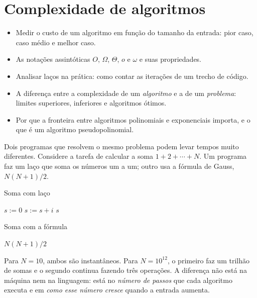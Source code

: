 \chapter{Complexidade de algoritmos}\label{cap:complex}\label{sec:complex}
\begin{objetivos}
\begin{itemize}
  \item Medir o custo de um algoritmo em função do tamanho da entrada: pior caso, caso médio e melhor caso.
  \item As notações assintóticas $O$, $\Omega$, $\Theta$, $o$ e $\omega$ e suas propriedades.
  \item Analisar laços na prática: como contar as iterações de um trecho de código.
  \item A diferença entre a complexidade de um \emph{algoritmo} e a de um \emph{problema}: limites superiores, inferiores e algoritmos ótimos.
  \item Por que a fronteira entre algoritmos polinomiais e exponenciais importa, e o que é um algoritmo pseudopolinomial.
\end{itemize}
\end{objetivos}

Dois programas que resolvem o mesmo problema podem levar tempos muito diferentes. Considere a tarefa de calcular a soma $1+2+\cdots+N$. Um programa faz um laço que soma os números um a um; outro usa a fórmula de Gauss, $N(N+1)/2$.
\begin{figura}
\begin{minipage}[t]{0.42\linewidth}
\begin{pseudo}{Soma com laço}
\begin{algorithmic}
\State $s:=0$
 \State $s:=s+i$ \EndFor
\State \Return $s$
\end{algorithmic}
\end{pseudo}
\end{minipage}\hspace{0.06\linewidth}%
\begin{minipage}[t]{0.42\linewidth}
\begin{pseudo}{Soma com a fórmula}
\begin{algorithmic}
\State \Return $N(N+1)/2$
\end{algorithmic}
\end{pseudo}
\end{minipage}
\end{figura}
Para $N=10$, ambos são instantâneos. Para $N=10^{12}$, o primeiro faz um trilhão de somas e o segundo continua fazendo três operações. A diferença não está na máquina nem na linguagem: está no \emph{número de passos} que cada algoritmo executa e em \emph{como esse número cresce} quando a entrada aumenta.

